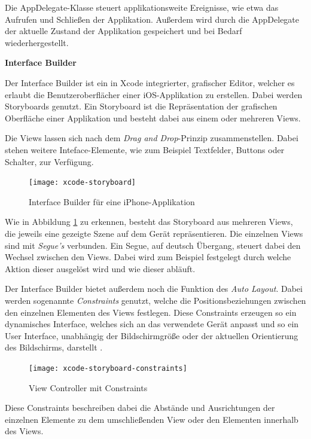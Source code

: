 Die AppDelegate-Klasse steuert applikationsweite Ereignisse, wie etwa das Aufrufen und Schließen der Applikation. Außerdem wird durch die AppDelegate der aktuelle Zustand der Applikation gespeichert und bei Bedarf wiederhergestellt.


\textbf{Interface Builder}

Der Interface Builder ist ein in Xcode integrierter, grafischer Editor, welcher es erlaubt die Benutzeroberflächer einer iOS-Applikation zu erstellen. Dabei werden Storyboards genutzt.
Ein Storyboard ist die Repräsentation der grafischen Oberfläche einer Applikation und besteht dabei aus einem oder mehreren Views.

Die Views lassen sich nach dem \emph{Drag and Drop}-Prinzip zusammenstellen. Dabei stehen weitere Inteface-Elemente, wie zum Beispiel Textfelder, Buttons oder Schalter, zur Verfügung.

\begin{figure}[htb!]
	\centering
	\texttt{[image: xcode-storyboard]}
	\caption{Interface Builder für eine iPhone-Applikation}
	\label{xcode-interface-builder}
\end{figure}

Wie in Abbildung \ref{xcode-interface-builder} zu erkennen, besteht das Storyboard aus mehreren Views, die jeweils eine gezeigte Szene auf dem Gerät repräsentieren. Die einzelnen Views sind mit \emph{Segue's} verbunden. Ein Segue, auf deutsch Übergang, steuert dabei den Wechsel zwischen den Views. Dabei wird zum Beispiel festgelegt durch welche Aktion dieser ausgelöst wird und wie dieser abläuft.


Der Interface Builder bietet außerdem noch die Funktion des \emph{Auto Layout}. Dabei werden sogenannte \emph{Constraints} genutzt, welche die Positionsbeziehungen zwischen den einzelnen Elementen des Views festlegen. Diese Constraints erzeugen so ein dynamisches Interface, welches sich an das verwendete Gerät anpasst und so ein User Interface, unabhängig der Bildschirmgröße oder der aktuellen Orientierung des Bildschirms, darstellt \cite{xcodeautolayout}.

\begin{figure}[htb!]
		\centering
	\texttt{[image: xcode-storyboard-constraints]}
	\caption{View Controller mit Constraints}
	\label{xcode-storyboard-constraints}
\end{figure}

Diese Constraints beschreiben dabei die Abstände und Ausrichtungen der einzelnen Elemente zu dem umschließenden View oder den Elementen innerhalb des Views.

